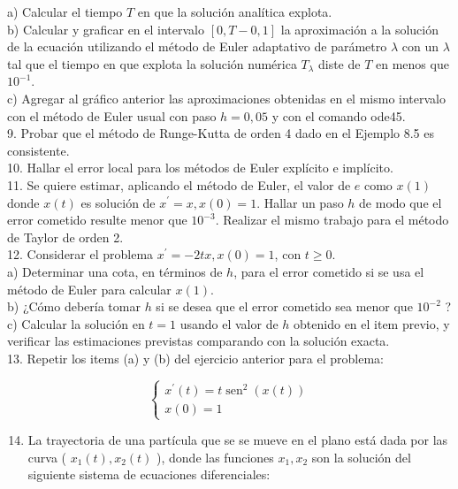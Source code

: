 \documentclass[10pt]{book}
\begin{document}
a) Calcular el tiempo $T$ en que la solución analítica explota.\\
b) Calcular y graficar en el intervalo $[0, T-0,1]$ la aproximación a la solución de la ecuación utilizando el método de Euler adaptativo de parámetro $\lambda$ con un $\lambda$ tal que el tiempo en que explota la solución numérica $T_{\lambda}$ diste de $T$ en menos que $10^{-1}$.\\
c) Agregar al gráfico anterior las aproximaciones obtenidas en el mismo intervalo con el método de Euler usual con paso $h=0,05$ y con el comando ode45.\\
9. Probar que el método de Runge-Kutta de orden 4 dado en el Ejemplo 8.5 es consistente.\\
10. Hallar el error local para los métodos de Euler explícito e implícito.\\
11. Se quiere estimar, aplicando el método de Euler, el valor de $e$ como $x(1)$ donde $x(t)$ es solución de $x^{\prime}=x, x(0)=1$. Hallar un paso $h$ de modo que el error cometido resulte menor que $10^{-3}$. Realizar el mismo trabajo para el método de Taylor de orden 2.\\
12. Considerar el problema $x^{\prime}=-2 t x, x(0)=1$, con $t \geq 0$.\\
a) Determinar una cota, en términos de $h$, para el error cometido si se usa el método de Euler para calcular $x(1)$.\\
b) ¿Cómo debería tomar $h$ si se desea que el error cometido sea menor que $10^{-2}$ ?\\
c) Calcular la solución en $t=1$ usando el valor de $h$ obtenido en el item previo, y verificar las estimaciones previstas comparando con la solución exacta.\\
13. Repetir los items (a) y (b) del ejercicio anterior para el problema:

$$
\left\{\begin{array}{l}
x^{\prime}(t)=t \operatorname{sen}^{2}(x(t)) \\
x(0)=1
\end{array}\right.
$$

\begin{enumerate}
  \setcounter{enumi}{13}
  \item La trayectoria de una partícula que se se mueve en el plano está dada por las curva ( $x_{1}(t), x_{2}(t)$ ), donde las funciones $x_{1}, x_{2}$ son la solución del siguiente sistema de ecuaciones diferenciales:
\end{enumerate}
\end{document}
